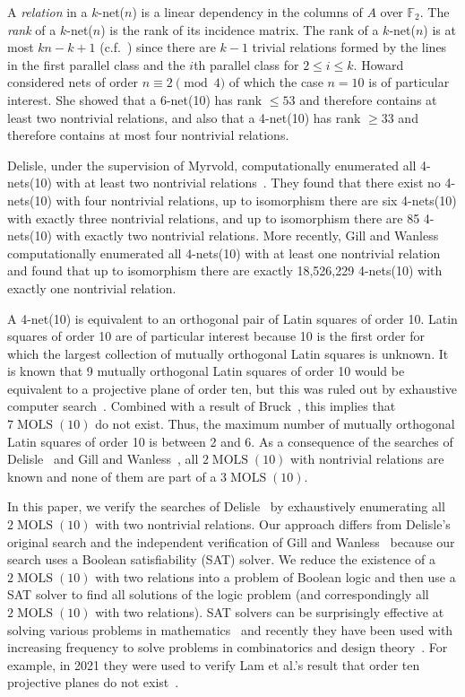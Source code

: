 \documentclass[runningheads]{llncs}
\newcommand{\F}{\mathbb{F}}
\newcommand{\MOLS}[2]{#1\operatorname{MOLS}(#2)}
\begin{document}
A \emph{relation} in a $k$-net($n$) is a linear dependency in the columns of $A$ over $\F_2$. The \emph{rank} of a $k$-net($n$) is the rank of its incidence matrix.  The rank of a $k$-net($n$) is at most $kn-k+1$ (c.f.~\cite{howard2010counterexample}) since there are $k-1$ trivial relations formed by the lines in the first parallel class and the $i$th parallel class for $2\leq i\leq k$.
Howard~\cite{howardthesis} considered nets of order $n\equiv 2\pmod{4}$ of which
the case $n=10$ is of particular interest.
She showed that a 6-net(10) has rank $\leq53$ and therefore contains at least two nontrivial relations, and also that a 4-net(10) has rank $\geq33$ and therefore contains at most four nontrivial relations.

Delisle, under the supervision of Myrvold, computationally enumerated all 4-nets(10) with at least two nontrivial relations~\cite{delisle2010search}.  They found that there exist no 4-nets(10) with four nontrivial relations, up to isomorphism there are six 4-nets(10) with exactly three nontrivial relations, and up to isomorphism there are 85 4-nets(10) with exactly two nontrivial relations.  More recently, Gill and Wanless~\cite{Gill2023} computationally enumerated all 4-nets(10) with at least one nontrivial relation and found that up to isomorphism there are exactly 18,526,229
4-nets(10) with exactly one nontrivial relation.

A 4-net(10) is equivalent to an orthogonal pair of Latin squares of order 10.  Latin squares of order 10 are of particular interest because 10 is the first order for which the largest collection of mutually orthogonal Latin squares is unknown.  It is known that 9 mutually orthogonal Latin squares of order 10 would be equivalent to a projective plane of order ten, but this was ruled out by exhaustive computer search~\cite{lam1989non}.  Combined with a result of Bruck~\cite{bruck1963finite}, this implies that $\MOLS{7}{10}$ do not exist.  Thus, the maximum number of mutually orthogonal Latin squares of order 10 is between 2 and 6.
As a consequence of the searches of Delisle~\cite{delisle2010search} and Gill and Wanless~\cite{Gill2023}, all $\MOLS{2}{10}$ with nontrivial relations are known and none of them are part of a $\MOLS{3}{10}$.

In this paper, we verify the searches of Delisle~\cite{delisle2010search} by exhaustively enumerating all $\MOLS{2}{10}$ with two nontrivial relations.  Our approach differs from Delisle's original search and the independent verification of Gill and Wanless~\cite{Gill2023} because our search uses a Boolean satisfiability (SAT) solver.  We reduce the existence of a $\MOLS{2}{10}$ with two relations into a problem of Boolean logic and then use a SAT solver to find all solutions of the logic problem (and correspondingly all $\MOLS{2}{10}$ with two relations).
SAT solvers can be surprisingly effective at solving various problems in mathematics~\cite{bright2020effective} and recently they
have been used with increasing frequency to solve problems in combinatorics and design theory~\cite{Zhang2021}.  For example, in 2021 they were used to verify Lam et al.'s result that order ten projective planes do not exist~\cite{bright2021sat}.
\end{document}
